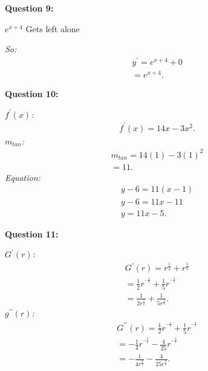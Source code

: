 \documentclass{report}
\begin{document}
    \bigbreak \noindent \bigbreak \noindent 
    \begin{Large}
        \noindent \textbf{Question 9:}
    \end{Large}
    \bigbreak \noindent 
    \bigbreak \noindent 
    \begin{center}
      $e^{x+4}$ Gets left alone
    \end{center}
    \bigbreak \noindent 
    \textit{So:}
    \begin{align*}
      y ^{\prime} = e^{x+4} + 0 \\
      = e^{x+4}
    .\end{align*}
    \bigbreak \noindent \bigbreak \noindent 
    \begin{Large}
        \noindent \textbf{Question 10:}
    \end{Large}
    \bigbreak \noindent 
    \bigbreak \noindent 
    \bigbreak \noindent 
    \textit{$f ^{\prime}(x)$:}
    \begin{align*}
      f ^{\prime}(x) = 14x-3x^2
    .\end{align*}
    \bigbreak \noindent 
    \textit{$m_{tan}$:}
    \begin{align*}
      m_{tan} = 14(1)-3(1)^2 \\ 
      = 11
    .\end{align*}
    \bigbreak \noindent 
    \textit{Equation:}
    \begin{align*}
      y - 6 = 11(x-1) \\ 
      y -6 = 11x-11 \\ 
      y = 11x -5
    .\end{align*}

    \bigbreak \noindent \bigbreak \noindent 
    \begin{Large}
        \noindent \textbf{Question 11:}
    \end{Large}
    \bigbreak \noindent 
    \bigbreak \noindent 
    \textit{$G ^{\prime}(r)$:}
    \begin{align*}
      G ^{\prime}(r) = r^{ \frac{1}{2}} + r^{ \frac{1}{5}} \\ 
      = \frac{1}{2}r^{ ^{-\frac{1}{2}}} + \frac{1}{5}r^{ ^{-\frac{4}{5}}} \\ 
      = \frac{1}{2r^{ \frac{1}{2}}} + \frac{1}{5r^{ \frac{4}{5}}}
    .\end{align*}
    \bigbreak \noindent 
    \textit{$g ^{\prime\prime}(r)$:}
    \begin{align*}
      G ^{\prime\prime}(r) = \frac{1}{2}r^{ ^{-\frac{1}{2}}} + \frac{1}{5}r^{ ^{-\frac{4}{5}}} \\
      = - \frac{1}{4}r^{ ^{-\frac{3}{2}}} - \frac{4}{25}r^{ ^{-\frac{9}{5}}} \\ 
      = - \frac{1}{4r^{ \frac{3}{2}}} - \frac{4}{25r^{ \frac{9}{5}}}
    .\end{align*}
\end{document}
